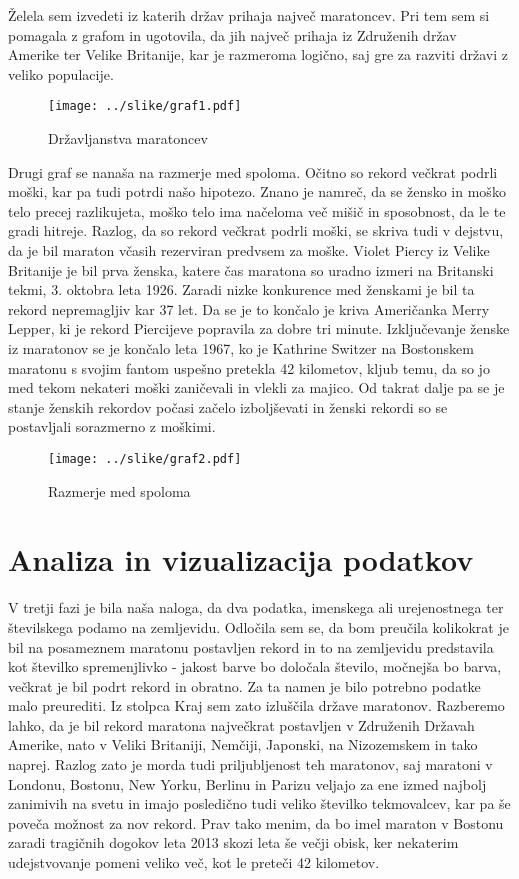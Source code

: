 \documentclass[11pt,a4paper]{article}
\begin{document}
Želela sem izvedeti iz katerih držav prihaja največ maratoncev. Pri tem sem si pomagala z grafom in ugotovila, da jih največ prihaja iz Združenih držav Amerike ter Velike Britanije, kar je razmeroma logično, saj gre za razviti državi z veliko populacije. 

\begin{figure}[H]
  \texttt{[image: ../slike/graf1.pdf]}
  \caption{Državljanstva maratoncev}
  \label{fig:Slika 1}
\end{figure}


Drugi graf se nanaša na razmerje med spoloma. Očitno so rekord večkrat podrli moški, kar pa tudi potrdi našo hipotezo. Znano je namreč, da se žensko in moško telo precej razlikujeta, moško telo ima načeloma več mišič in sposobnost, da le te gradi hitreje.
Razlog, da so rekord večkrat podrli moški, se skriva tudi v dejstvu, da je bil maraton včasih rezerviran predvsem za moške. Violet Piercy iz Velike Britanije je bil prva ženska, katere čas maratona so uradno izmeri na Britanski tekmi, 3. oktobra leta 1926. Zaradi nizke konkurence med ženskami je bil ta rekord nepremagljiv kar 37 let. Da se je to končalo je kriva Američanka Merry Lepper, ki je rekord Piercijeve popravila za dobre tri minute.
Izključevanje ženske iz maratonov se je končalo leta 1967, ko je Kathrine Switzer na Bostonskem maratonu s svojim fantom uspešno pretekla 42 kilometov, kljub temu, da so jo med tekom nekateri moški zaničevali in vlekli za majico. Od takrat dalje pa se je stanje ženskih rekordov počasi začelo izboljševati in ženski rekordi so se postavljali sorazmerno z moškimi.



\begin{figure}[H]
  \texttt{[image: ../slike/graf2.pdf]}
  \caption{Razmerje med spoloma}
  \label{fig:Slika 2}
\end{figure}

\newpage
\section{Analiza in vizualizacija podatkov}

V tretji fazi je bila naša naloga, da dva podatka, imenskega ali urejenostnega ter številskega podamo na zemljevidu. 
Odločila sem se, da bom preučila kolikokrat je bil na posameznem maratonu postavljen rekord in to na zemljevidu predstavila kot številko spremenjlivko - jakost barve bo določala število, močnejša bo barva, večkrat je bil podrt rekord in obratno. Za ta namen je bilo potrebno podatke malo preurediti. Iz stolpca Kraj sem zato izluščila države maratonov. 
Razberemo lahko, da je bil rekord maratona največkrat postavljen v Združenih Državah Amerike, nato v Veliki Britaniji, Nemčiji, Japonski, na Nizozemskem in tako naprej. Razlog zato je morda tudi priljubljenost teh maratonov, saj maratoni v Londonu, Bostonu, New Yorku, Berlinu in Parizu veljajo za ene izmed najbolj zanimivih na svetu in imajo posledično tudi veliko številko tekmovalcev, kar pa še poveča možnost za nov rekord. Prav tako menim, da bo imel maraton v Bostonu zaradi tragičnih dogokov leta 2013 skozi leta še večji obisk, ker nekaterim udejstvovanje pomeni veliko več, kot le preteči 42 kilometov.
\end{document}
